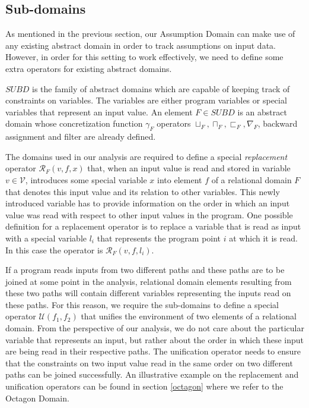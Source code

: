 \documentclass[10pt]{report}
\begin{document}
\subsection{Sub-domains} \label{sub-domains}

As mentioned in the previous section, our Assumption Domain can make use of any existing abstract domain in order to track assumptions on input data. However, in order for this setting to work effectively, we need to define some extra operators for existing abstract domains. 

$SUBD$ is the family of abstract domains which are capable of keeping track of constraints on variables. The variables are either program variables or special variables that represent an input value. An element $F \in SUBD$ is an abstract domain whose concretization function $\gamma_{F}$ operators $\sqcup_{F}, \sqcap_{F}, \sqsubset_{F}, \nabla_{F}$, backward assignment and filter are already defined.
 
The domains used in our analysis are required to define a special \textit{replacement} operator $ \mathcal{R}_{F}(v, f, x) $ that, when an input value is read and stored in variable $ v \in \mathcal{V} $, introduces some special variable $ x $ into element $ f $ of a relational domain $ F $ that denotes this input value and its relation to other variables. This newly introduced variable has to provide information on the order in which an input value was read with respect to other input values in the program. One possible definition for a replacement operator is to replace a variable that is read as input with a special variable $ l_{i} $ that represents the program point $ i $ at which it is read. In this case the operator is $ \mathcal{R}_{F}(v, f, l_{i}) $. 

 
If a program reads inputs from two different paths and these paths are to be joined at some point in the analysis, relational domain elements resulting from these two paths will contain different variables representing the inputs read on these paths. For this reason, we require the sub-domains to define a special operator $ \mathcal{U}(f_{1}, f_{2}) $ that unifies the environment of two elements of a relational domain. From the perspective of our analysis, we do not care about the particular variable that represents an input, but rather about the order in which these input are being read in their respective paths. The unification operator needs to ensure that the constraints on two input value read in the same order on two different paths can be joined successfully. An illustrative example on the replacement and unification operators can be found in section \ref{octagon} where we refer to the Octagon Domain.
\end{document}
